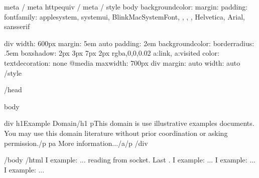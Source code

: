 \documentclass[a4paper,12pt,english]{sphinxmanual}
\begin{document}
{{\begin{sphinxVerbatim}[commandchars=\\\{\}]
\PYGZlt{}meta  /\PYGZgt{}
\PYGZlt{}meta http\PYGZhy{}equiv  /\PYGZgt{}
\PYGZlt{}meta   /\PYGZgt{}
\PYGZlt{}style \PYGZgt{}
body 
    background\PYGZhy{}color: 
    margin: 
    padding: 
    font\PYGZhy{}family: \PYGZhy{}apple\PYGZhy{}system, system\PYGZhy{}ui, BlinkMacSystemFont, , , , Helvetica, Arial, sans\PYGZhy{}serif

div 
    width: 600px
    margin: 5em auto
    padding: 2em
    background\PYGZhy{}color: 
    border\PYGZhy{}radius: .5em
    box\PYGZhy{}shadow: 2px 3px 7px 2px rgba,0,0,0.02
a:link, a:visited 
    color: 
    text\PYGZhy{}decoration: none
@media max\PYGZhy{}width: 700px 
    div 
        margin:  auto
        width: auto
\PYGZlt{}/style\PYGZgt{}    

\PYGZlt{}/head\PYGZgt{}

\PYGZlt{}body\PYGZgt{}

\PYGZlt{}div\PYGZgt{}
    \PYGZlt{}h1\PYGZgt{}Example Domain\PYGZlt{}/h1\PYGZgt{}
    \PYGZlt{}p\PYGZgt{}This domain is  use  illustrative examples  documents. You may use this
    domain  literature without prior coordination or asking  permission.\PYGZlt{}/p\PYGZgt{}
    \PYGZlt{}p\PYGZgt{}\PYGZlt{}a \PYGZgt{}More information...\PYGZlt{}/a\PYGZgt{}\PYGZlt{}/p\PYGZgt{}
\PYGZlt{}/div\PYGZgt{}

\PYGZlt{}/body\PYGZgt{}
\PYGZlt{}/html\PYGZgt{}
I  example: ...  reading from socket. Last   .
I  example: ... 
I  example: ... 
I  example: ... 
\end{sphinxVerbatim}

}}
\end{document}
